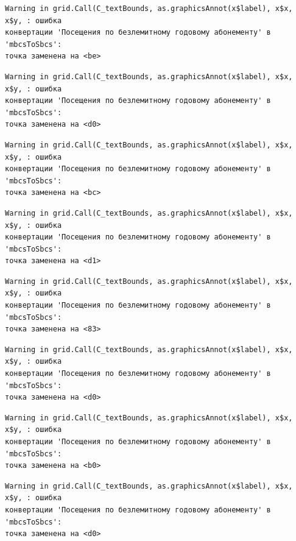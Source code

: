 \documentclass[
  letterpaper,
  DIV=11,
  numbers=noendperiod]{scrreprt}
\begin{document}
\begin{verbatim}
Warning in grid.Call(C_textBounds, as.graphicsAnnot(x$label), x$x, x$y, : ошибка
конвертации 'Посещения по безлемитному годовому абонементу' в 'mbcsToSbcs':
точка заменена на <be>
\end{verbatim}

\begin{verbatim}
Warning in grid.Call(C_textBounds, as.graphicsAnnot(x$label), x$x, x$y, : ошибка
конвертации 'Посещения по безлемитному годовому абонементу' в 'mbcsToSbcs':
точка заменена на <d0>
\end{verbatim}

\begin{verbatim}
Warning in grid.Call(C_textBounds, as.graphicsAnnot(x$label), x$x, x$y, : ошибка
конвертации 'Посещения по безлемитному годовому абонементу' в 'mbcsToSbcs':
точка заменена на <bc>
\end{verbatim}

\begin{verbatim}
Warning in grid.Call(C_textBounds, as.graphicsAnnot(x$label), x$x, x$y, : ошибка
конвертации 'Посещения по безлемитному годовому абонементу' в 'mbcsToSbcs':
точка заменена на <d1>
\end{verbatim}

\begin{verbatim}
Warning in grid.Call(C_textBounds, as.graphicsAnnot(x$label), x$x, x$y, : ошибка
конвертации 'Посещения по безлемитному годовому абонементу' в 'mbcsToSbcs':
точка заменена на <83>
\end{verbatim}

\begin{verbatim}
Warning in grid.Call(C_textBounds, as.graphicsAnnot(x$label), x$x, x$y, : ошибка
конвертации 'Посещения по безлемитному годовому абонементу' в 'mbcsToSbcs':
точка заменена на <d0>
\end{verbatim}

\begin{verbatim}
Warning in grid.Call(C_textBounds, as.graphicsAnnot(x$label), x$x, x$y, : ошибка
конвертации 'Посещения по безлемитному годовому абонементу' в 'mbcsToSbcs':
точка заменена на <b0>
\end{verbatim}

\begin{verbatim}
Warning in grid.Call(C_textBounds, as.graphicsAnnot(x$label), x$x, x$y, : ошибка
конвертации 'Посещения по безлемитному годовому абонементу' в 'mbcsToSbcs':
точка заменена на <d0>
\end{verbatim}
\end{document}
